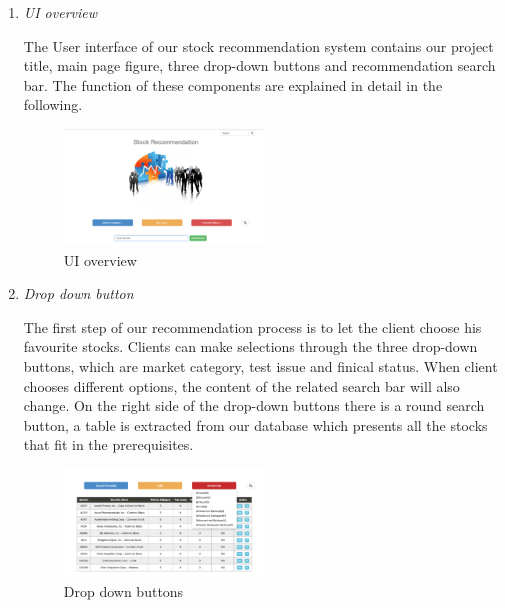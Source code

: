 \documentclass[10pt, conference, compsocconf]{IEEEtran}
\begin{document}
\begin{enumerate}[label=\Alph*]
 
  \item  \textit{UI overview}

The User interface of our stock recommendation system contains our project title, main page figure, three drop-down buttons and recommendation search bar.  The function of these components are explained in detail in the following.\\
           \begin{figure}[!h]
            \centering
           \includegraphics[width=0.5\textwidth]{figures/UI_overview.jpg}
           \caption{UI overview}
          \vspace{0.1cm}
    \end{figure}

    
    
 \item  \textit{Drop down button}

 The first step of our recommendation process is to let the client choose his favourite stocks. Clients can make selections through the three drop-down buttons, which are market category, test issue and finical status. When client chooses different options, the content of the related search bar will also change.  On the right side of the drop-down buttons there is a round search button, a table is extracted from our database which presents all the stocks that fit in the prerequisites. \\
 \begin{figure}[!h]
            \centering
           \includegraphics[width=0.5\textwidth]{figures/drop_down_button.jpg}
           \caption{Drop down buttons}
          \vspace{0.1cm}
    \end{figure}


\end{enumerate}
\end{document}

